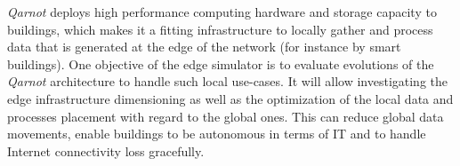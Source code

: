 \emph{Qarnot} deploys high performance computing hardware and storage capacity to buildings, which makes it a fitting infrastructure to locally gather and process data that is generated at the edge of the network (for instance by smart buildings). One objective of the edge simulator is to evaluate evolutions of the \emph{Qarnot} architecture to handle such local use-cases. It will allow investigating the edge infrastructure dimensioning as well as the optimization of the local data and processes placement with regard to the global ones. This can reduce global data movements, enable buildings to be autonomous in terms of IT and to handle Internet connectivity loss gracefully.




